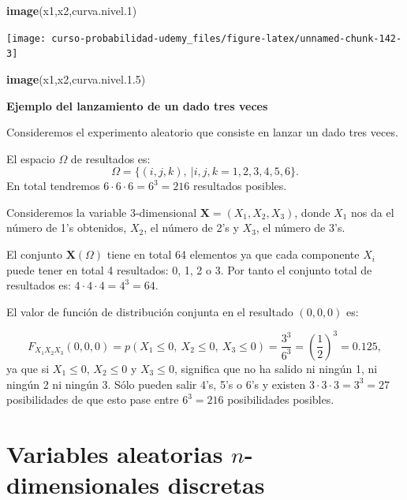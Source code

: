 \documentclass[]{book}
\newenvironment{Shaded}{\begin{snugshade}}{\end{snugshade}}
\newcommand{\FloatTok}[1]{\textcolor[rgb]{0.00,0.00,0.81}{#1}}
\newcommand{\KeywordTok}[1]{\textcolor[rgb]{0.13,0.29,0.53}{\textbf{#1}}}
\newcommand{\NormalTok}[1]{#1}
\begin{document}
\begin{Shaded}
\begin{Highlighting}[]
\KeywordTok{image}\NormalTok{(x1,x2,curva.nivel}\FloatTok{.1}\NormalTok{)}
\end{Highlighting}
\end{Shaded}

\begin{center}\texttt{[image: curso-probabilidad-udemy\_files/figure-latex/unnamed-chunk-142-3]} \end{center}

\begin{Shaded}
\begin{Highlighting}[]
\KeywordTok{image}\NormalTok{(x1,x2,curva.nivel.}\FloatTok{1.5}\NormalTok{)}
\end{Highlighting}
\end{Shaded}

\textbf{Ejemplo del lanzamiento de un dado tres veces}

Consideremos el experimento aleatorio que consiste en lanzar un dado tres veces.

El espacio \(\Omega\) de resultados es:
\[
\Omega =\{(i,j,k),\ | i,j,k=1,2,3,4,5,6\}.
\]
En total tendremos \(6\cdot 6\cdot 6=6^3=216\) resultados posibles.

Consideremos la variable 3-dimensional \(\mathbf{X}=(X_1,X_2,X_3)\), donde \(X_1\) nos da el número de 1's obtenidos, \(X_2\), el número de 2's y \(X_3\), el número de 3's.

El conjunto \(\mathbf{X}(\Omega)\) tiene en total 64 elementos ya que cada componente \(X_i\) puede tener en total 4 resultados: 0, 1, 2 o 3. Por tanto el conjunto total de resultados es: \(4\cdot 4\cdot 4=4^3=64\).

El valor de función de distribución conjunta en el resultado \((0,0,0)\) es:

\[
F_{X_1X_2X_3}(0,0,0)=p(X_1\leq 0,\ X_2\leq 0,\ X_3\leq 0)=\frac{3^3}{6^3}=\left(\frac{1}{2}\right)^3 =0.125,
\]
ya que si \(X_1\leq 0\), \(X_2\leq 0\) y \(X_3\leq 0\), significa que no ha salido ni ningún 1, ni ningún 2 ni ningún 3. Sólo pueden salir 4's, 5's o 6's y existen \(3\cdot 3\cdot 3=3^3=27\) posibilidades de que esto pase entre \(6^3=216\) posibilidades posibles.

\hypertarget{variables-aleatorias-n-dimensionales-discretas}{%
\section{\texorpdfstring{Variables aleatorias \(n\)-dimensionales discretas}{Variables aleatorias n-dimensionales discretas}}\label{variables-aleatorias-n-dimensionales-discretas}}
\end{document}
